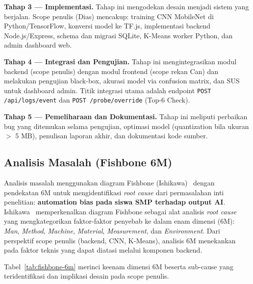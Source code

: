 \documentclass[12pt,a4paper,oneside,openany]{report}
\begin{document}
\textbf{Tahap 3 --- Implementasi.} Tahap ini mengodekan desain menjadi sistem yang berjalan. Scope penulis (Dias) mencakup: training CNN MobileNet di Python/TensorFlow, konversi model ke TF.js, implementasi backend Node.js/Express, schema dan migrasi SQLite, K-Means worker Python, dan admin dashboard web.

\textbf{Tahap 4 --- Integrasi dan Pengujian.} Tahap ini mengintegrasikan modul backend (scope penulis) dengan modul frontend (scope rekan Can) dan melakukan pengujian black-box, akurasi model via confusion matrix, dan SUS untuk dashboard admin. Titik integrasi utama adalah endpoint \texttt{POST /api/logs/event} dan \texttt{POST /probe/override} (Top-6 Check).

\textbf{Tahap 5 --- Pemeliharaan dan Dokumentasi.} Tahap ini meliputi perbaikan bug yang ditemukan selama pengujian, optimasi model (quantization bila ukuran $>$ 5 MB), penulisan laporan akhir, dan dokumentasi kode sumber.

\subsection{Analisis Masalah (Fishbone 6M)}
\label{subsec:analisis-masalah}

Analisis masalah menggunakan diagram Fishbone (Ishikawa)~\cite{ref14} dengan pendekatan 6M untuk mengidentifikasi \textit{root cause} dari permasalahan inti penelitian: \textbf{automation bias pada siswa SMP terhadap output AI}. Ishikawa~\cite{ref14} memperkenalkan diagram Fishbone sebagai alat analisis \textit{root cause} yang mengkategorikan faktor-faktor penyebab ke dalam enam dimensi (6M): \textit{Man}, \textit{Method}, \textit{Machine}, \textit{Material}, \textit{Measurement}, dan \textit{Environment}. Dari perspektif scope penulis (backend, CNN, K-Means), analisis 6M menekankan pada faktor teknis yang dapat diatasi melalui komponen backend.

Tabel~\ref{tab:fishbone-6m} merinci keenam dimensi 6M beserta sub-cause yang teridentifikasi dan implikasi desain pada scope penulis.
\end{document}
